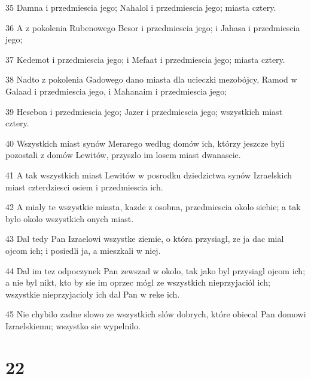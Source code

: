 \par 35 Damna i przedmiescia jego; Nahalol i przedmiescia jego; miasta cztery.
\par 36 A z pokolenia Rubenowego Besor i przedmiescia jego; i Jahasa i przedmiescia jego;
\par 37 Kedemot i przedmiescia jego; i Mefaat i przedmiescia jego; miasta cztery.
\par 38 Nadto z pokolenia Gadowego dano miasta dla ucieczki mezobójcy, Ramod w Galaad i przedmiescia jego, i Mahanaim i przedmiescia jego;
\par 39 Hesebon i przedmiescia jego; Jazer i przedmiescia jego; wszystkich miast cztery.
\par 40 Wszystkich miast synów Merarego wedlug domów ich, którzy jeszcze byli pozostali z domów Lewitów, przyszlo im losem miast dwanascie.
\par 41 A tak wszystkich miast Lewitów w posrodku dziedzictwa synów Izraelskich miast czterdziesci osiem i przedmiescia ich.
\par 42 A mialy te wszystkie miasta, kazde z osobna, przedmiescia okolo siebie; a tak bylo okolo wszystkich onych miast.
\par 43 Dal tedy Pan Izraelowi wszystke ziemie, o która przysiagl, ze ja dac mial ojcom ich; i posiedli ja, a mieszkali w niej.
\par 44 Dal im tez odpoczynek Pan zewszad w okolo, tak jako byl przysiagl ojcom ich; a nie byl nikt, kto by sie im oprzec mógl ze wszystkich nieprzyjaciól ich; wszystkie nieprzyjacioly ich dal Pan w reke ich.
\par 45 Nie chybilo zadne slowo ze wszystkich slów dobrych, które obiecal Pan domowi Izraelskiemu; wszystko sie wypelnilo.

\chapter{22}

